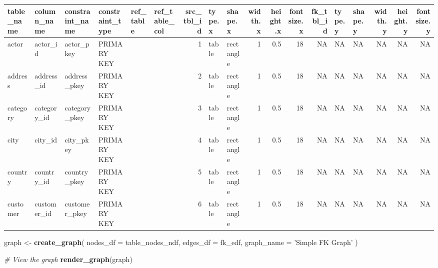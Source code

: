 \documentclass[]{book}
\newenvironment{Shaded}{\begin{snugshade}}{\end{snugshade}}
\newcommand{\CommentTok}[1]{\textcolor[rgb]{0.56,0.35,0.01}{\textit{#1}}}
\newcommand{\DataTypeTok}[1]{\textcolor[rgb]{0.13,0.29,0.53}{#1}}
\newcommand{\DecValTok}[1]{\textcolor[rgb]{0.00,0.00,0.81}{#1}}
\newcommand{\KeywordTok}[1]{\textcolor[rgb]{0.13,0.29,0.53}{\textbf{#1}}}
\newcommand{\NormalTok}[1]{#1}
\newcommand{\OperatorTok}[1]{\textcolor[rgb]{0.81,0.36,0.00}{\textbf{#1}}}
\newcommand{\StringTok}[1]{\textcolor[rgb]{0.31,0.60,0.02}{#1}}
\theoremstyle{definition}
\theoremstyle{definition}
\theoremstyle{definition}
\theoremstyle{remark}
\begin{document}
\begin{tabular}{l|l|l|l|l|l|r|l|l|r|r|r|r|l|l|r|r|r}
\hline
table\_name & column\_name & constraint\_name & constraint\_type & ref\_table & ref\_table\_col & src\_tbl\_id & type.x & shape.x & width.x & height.x & fontsize.x & fk\_tbl\_id & type.y & shape.y & width.y & height.y & fontsize.y\\
\hline
actor & actor\_id & actor\_pkey & PRIMARY KEY &  &  & 1 & table & rectangle & 1 & 0.5 & 18 & NA & NA & NA & NA & NA & NA\\
\hline
address & address\_id & address\_pkey & PRIMARY KEY &  &  & 2 & table & rectangle & 1 & 0.5 & 18 & NA & NA & NA & NA & NA & NA\\
\hline
category & category\_id & category\_pkey & PRIMARY KEY &  &  & 3 & table & rectangle & 1 & 0.5 & 18 & NA & NA & NA & NA & NA & NA\\
\hline
city & city\_id & city\_pkey & PRIMARY KEY &  &  & 4 & table & rectangle & 1 & 0.5 & 18 & NA & NA & NA & NA & NA & NA\\
\hline
country & country\_id & country\_pkey & PRIMARY KEY &  &  & 5 & table & rectangle & 1 & 0.5 & 18 & NA & NA & NA & NA & NA & NA\\
\hline
customer & customer\_id & customer\_pkey & PRIMARY KEY &  &  & 6 & table & rectangle & 1 & 0.5 & 18 & NA & NA & NA & NA & NA & NA\\
\hline
\end{tabular}

\begin{Shaded}
\end{Shaded}

\begin{Shaded}
\begin{Highlighting}[]
\NormalTok{graph <-}
\StringTok{  }\KeywordTok{create_graph}\NormalTok{(}
    \DataTypeTok{nodes_df =}\NormalTok{ table_nodes_ndf,}
    \DataTypeTok{edges_df =}\NormalTok{ fk_edf,}
    \DataTypeTok{graph_name =} \StringTok{'Simple FK Graph'}
\NormalTok{    )}

\CommentTok{# View the graph}
\KeywordTok{render_graph}\NormalTok{(graph)}
\end{Highlighting}
\end{Shaded}
\end{document}

